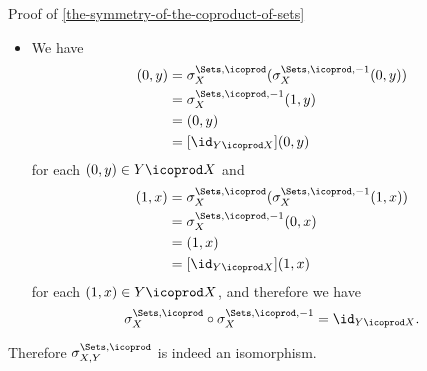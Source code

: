 \begin{Proof}{Proof of \cref{the-symmetry-of-the-coproduct-of-sets}}
\begin{itemize}
\begin{align*}
                                                                                          &= \sigma^{\Sets,\icoprod,-1}_{X}(0,y)\\
                                                                                          &= (1,y)\\
                                                                                          &= [\id_{X\icoprod Y}](1,y)
            \end{align*}
            for each $(1,y)\in X\icoprod Y$, and therefore we have
            \[
                \sigma^{\Sets,\icoprod,-1}_{X,Y}%
                \circ%
                \sigma^{\Sets,\icoprod}_{X,Y}%
                =%
                \id_{X\icoprod Y}.%
            \]%
        \item{}We have
            \begin{align*}
                [\sigma^{\Sets,\icoprod}_{X,Y}\circ\sigma^{\Sets,\icoprod,-1}_{X,Y}](0,y) &= \sigma^{\Sets,\icoprod}_{X}(\sigma^{\Sets,\icoprod,-1}_{X}(0,y))\\
                                                                                          &= \sigma^{\Sets,\icoprod,-1}_{X}(1,y)\\
                                                                                          &= (0,y)\\
                                                                                          &= [\id_{Y\icoprod X}](0,y)
            \end{align*}
            for each $(0,y)\in Y\icoprod X$ and
            \begin{align*}
                [\sigma^{\Sets,\icoprod}_{X,Y}\circ\sigma^{\Sets,\icoprod,-1}_{X,Y}](1,x) &= \sigma^{\Sets,\icoprod}_{X}(\sigma^{\Sets,\icoprod,-1}_{X}(1,x))\\
                                                                                          &= \sigma^{\Sets,\icoprod,-1}_{X}(0,x)\\
                                                                                          &= (1,x)\\
                                                                                          &= [\id_{Y\icoprod X}](1,x)
            \end{align*}
            for each $(1,x)\in Y\icoprod X$, and therefore we have
            \[
                \sigma^{\Sets,\icoprod}_{X}%
                \circ%
                \sigma^{\Sets,\icoprod,-1}_{X}%
                =%
                \id_{Y\icoprod X}.%
            \]%
    \end{itemize}
    Therefore $\sigma^{\Sets,\icoprod}_{X,Y}$ is indeed an isomorphism.


\end{Proof}
